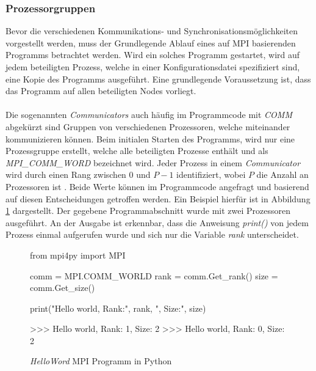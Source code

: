 \subsubsection{Prozessorgruppen}
Bevor die verschiedenen Kommunikations- und Synchronisationsmöglichkeiten vorgestellt werden, muss der Grundlegende Ablauf eines auf \ac{MPI} basierenden Programms betrachtet werden. Wird ein solches Programm gestartet, wird auf jedem beteiligten Prozess, welche in einer Konfigurationsdatei spezifiziert sind, eine Kopie des Programms ausgeführt. Eine grundlegende Voraussetzung ist, dass das Programm auf allen beteiligten Nodes vorliegt. 
\\\\
Die sogenannten \emph{Communicators} auch häufig im Programmcode mit \emph{COMM} abgekürzt sind Gruppen von verschiedenen Prozessoren, welche miteinander kommunizieren können. Beim initialen Starten des Programms, wird nur eine Prozessgruppe erstellt, welche alle beteiligten Prozesse enthält und als \emph{MPI\_COMM\_WORD} bezeichnet wird. Jeder Prozess in einem \emph{Communicator} wird  durch einen Rang zwischen $0$ und $P-1$ identifiziert, wobei $P$ die Anzahl an Prozessoren ist \cite{nielsen2016introduction}. Beide Werte können im Programmcode angefragt und basierend auf diesen Entscheidungen getroffen werden. Ein Beispiel hierfür ist in Abbildung \ref{fig:example_process_group} dargestellt. Der gegebene Programmabschnitt wurde mit zwei Prozessoren ausgeführt. An der Ausgabe ist erkennbar, dass die Anweisung \emph{print()} von jedem Prozess einmal aufgerufen wurde und sich nur die Variable \emph{rank} unterscheidet. 
\begin{figure}
	
	\begin{python}
		from mpi4py import MPI
		
		comm = MPI.COMM_WORLD
		rank = comm.Get_rank()
		size = comm.Get_size()
		
		print("Hello world, Rank:", rank, ", Size:", size)
		
		>>> Hello world, Rank: 1, Size: 2
		>>> Hello world, Rank: 0, Size: 2
	\end{python}
	\caption{\emph{HelloWord} \ac{MPI} Programm in Python}
	\label{fig:example_process_group}
\end{figure}



